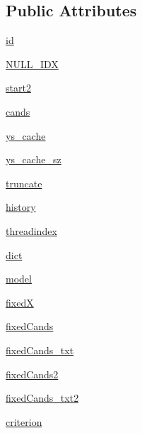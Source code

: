 \subsection*{Public Attributes}
\begin{DoxyCompactItemize}
\item 
\hyperlink{classkvmemnn_1_1KvmemnnAgent_af916a421898a2fa6d5ce4f6b279635a4}{id}
\item 
\hyperlink{classkvmemnn_1_1KvmemnnAgent_afdba3b0e989e4da5dac9024a911c8716}{N\+U\+L\+L\+\_\+\+I\+DX}
\item 
\hyperlink{classkvmemnn_1_1KvmemnnAgent_a186fc276d5d035c1b27349cf93bdbbfa}{start2}
\item 
\hyperlink{classkvmemnn_1_1KvmemnnAgent_a30dfea4410f97b8a0cf44e0a374f3a62}{cands}
\item 
\hyperlink{classkvmemnn_1_1KvmemnnAgent_aa591b18b67874b89d945b898efff188c}{ys\+\_\+cache}
\item 
\hyperlink{classkvmemnn_1_1KvmemnnAgent_af48143451b92d842a0cb5963f439f6e7}{ys\+\_\+cache\+\_\+sz}
\item 
\hyperlink{classkvmemnn_1_1KvmemnnAgent_a4c12d4c70d11ba9420c7104f95bea7e7}{truncate}
\item 
\hyperlink{classkvmemnn_1_1KvmemnnAgent_a732ab44660d83f2052b1440efbc2d5e2}{history}
\item 
\hyperlink{classkvmemnn_1_1KvmemnnAgent_a1014d9451e7d78217dae10ea1dcf9c1a}{threadindex}
\item 
\hyperlink{classkvmemnn_1_1KvmemnnAgent_a05d5080eba5a91b8ddd2aa42726e95d2}{dict}
\item 
\hyperlink{classkvmemnn_1_1KvmemnnAgent_a49f09374ce57503c219e8e872527332e}{model}
\item 
\hyperlink{classkvmemnn_1_1KvmemnnAgent_a08acbbc59ff955add282f0e502b94cfe}{fixedX}
\item 
\hyperlink{classkvmemnn_1_1KvmemnnAgent_a0d2db03a067bf5ec18a82946de160c34}{fixed\+Cands}
\item 
\hyperlink{classkvmemnn_1_1KvmemnnAgent_af79f7f554e0f22bf2a039189118af007}{fixed\+Cands\+\_\+txt}
\item 
\hyperlink{classkvmemnn_1_1KvmemnnAgent_ac40dc319e8e847332f7764291ce8f276}{fixed\+Cands2}
\item 
\hyperlink{classkvmemnn_1_1KvmemnnAgent_a530d6628bb7968857f175d6da15d791b}{fixed\+Cands\+\_\+txt2}
\item 
\hyperlink{classkvmemnn_1_1KvmemnnAgent_abde299385d9ff9fbbebaa20de4ab371b}{criterion}
\item 

\end{DoxyCompactItemize}
